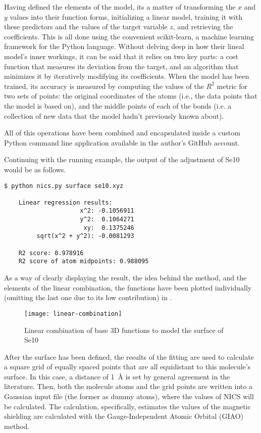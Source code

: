 Having defined the elements of the model, its a matter of transforming the $x$ and $y$ values into their function forms, initializing a linear model, training it with these predictors and the values of the target variable $z$, and retrieving the coefficients.
This is all done using the convenient scikit-learn, a machine learning framework for the Python language.
Without delving deep in how their lineal model's inner workings, it can be said that it relies on two key parts: a cost function that measures its deviation from the target, and an algorithm that minimizes it by iteratively modifying its coefficients.
When the model has been trained, its accuracy is measured by computing the values of the $R^2$ metric for two sets of points: the original coordinates of the atoms (i.e., the data points that the model is based on), and the middle points of each of the bonds (i.e. a collection of new data that the model hadn't previously known about).

All of this operations have been combined and encapsulated inside a custom Python command line application available in the author's GitHub account.

Continuing with the running example, the output of the adjustment of Se10 would be as follows.
\begin{lstlisting}[label=se10-output, style=kaolstplain]
$ python nics.py surface se10.xyz

    Linear regression results:
                     x^2: -0.1056911
                     y^2:  0.1064271
                      xy:  0.1375246
         sqrt(x^2 + y^2): -0.0081293

    R2 score: 0.978916
    R2 score of atom midpoints: 0.988095
\end{lstlisting}

As a way of clearly displaying the result, the idea behind the method, and the elements of the linear combination, the functions have been plotted individually (omitting the last one due to its low contribution) in .

\begin{figure*}
    \centering
    \texttt{[image: linear-combination]}
    \caption[Linear combination of base 3D functions]{Linear combination of base 3D functions to model the surface of Se10}
\end{figure*}

After the surface has been defined, the results of the fitting are used to calculate a square grid of equally spaced points that are all equidistant to this molecule's surface.
In this case, a distance of \SI{1}{\angstrom} is set by general agreement in the literature.
Then, both the molecule atoms and the grid points are written into a Gaussian input file (the former as dummy atoms), where the values of NICS will be calculated.
The calculation, specifically, estimates the values of the magnetic shielding are calculated with the Gauge-Independent Atomic Orbital (GIAO) method.

